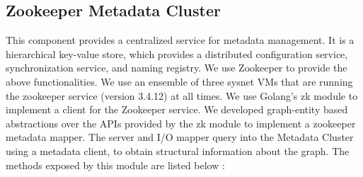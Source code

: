 \documentclass[letterpaper, 11 pt, conference]{ieeeconf}  %
\begin{document}
\subsection{Zookeeper Metadata Cluster} This component provides a centralized service for metadata management. It is a hierarchical key-value store, which provides a distributed configuration service, synchronization service, and naming registry. We use Zookeeper to provide the above functionalities. We use an ensemble of three sysnet VMs that are running the zookeeper service (version 3.4.12) at all times. We use Golang's zk\cite{go/zk} module to implement a client for the Zookeeper service. We developed graph-entity based abstractions over the APIs provided by the zk module to implement a zookeeper metadata mapper. The server and I/O mapper query into the Metadata Cluster using a metadata client, to obtain structural information about the graph. The methods exposed by this module are listed below :
\end{document}
